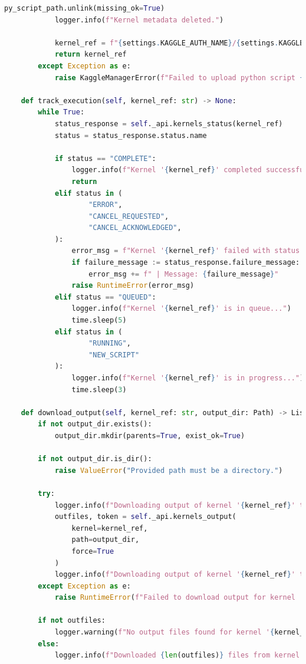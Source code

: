 \begin{lstlisting}[language=Python, numbers=none, frame=none]
            py_script_path.unlink(missing_ok=True)
            logger.info(f"Kernel metadata deleted.")

            kernel_ref = f"{settings.KAGGLE_AUTH_NAME}/{settings.KAGGLE_KERNEL_TITLE}"
            return kernel_ref
        except Exception as e:
            raise KaggleManagerError(f"Failed to upload python script {py_script_path} to Kaggle.") from e

    def track_execution(self, kernel_ref: str) -> None:
        while True:
            status_response = self._api.kernels_status(kernel_ref)
            status = status_response.status.name

            if status == "COMPLETE":
                logger.info(f"Kernel '{kernel_ref}' completed successfully.")
                return
            elif status in (
                    "ERROR",
                    "CANCEL_REQUESTED",
                    "CANCEL_ACKNOWLEDGED",
            ):
                error_msg = f"Kernel '{kernel_ref}' failed with status: {status}"
                if failure_message := status_response.failure_message:
                    error_msg += f" | Message: {failure_message}"
                raise RuntimeError(error_msg)
            elif status == "QUEUED":
                logger.info(f"Kernel '{kernel_ref}' is in queue...")
                time.sleep(5)
            elif status in (
                    "RUNNING",
                    "NEW_SCRIPT"
            ):
                logger.info(f"Kernel '{kernel_ref}' is in progress...")
                time.sleep(3)

    def download_output(self, kernel_ref: str, output_dir: Path) -> List[Path]:
        if not output_dir.exists():
            output_dir.mkdir(parents=True, exist_ok=True)

        if not output_dir.is_dir():
            raise ValueError("Provided path must be a directory.")

        try:
            logger.info(f"Downloading output of kernel '{kernel_ref}' to '{output_dir}'...")
            outfiles, token = self._api.kernels_output(
                kernel=kernel_ref,
                path=output_dir,
                force=True
            )
            logger.info(f"Downloading output of kernel '{kernel_ref}' to '{output_dir}' completed successfully.")
        except Exception as e:
            raise RuntimeError(f"Failed to download output for kernel '{kernel_ref}'") from e

        if not outfiles:
            logger.warning(f"No output files found for kernel '{kernel_ref}'")
        else:
            logger.info(f"Downloaded {len(outfiles)} files from kernel '{kernel_ref}'")


\end{lstlisting}
